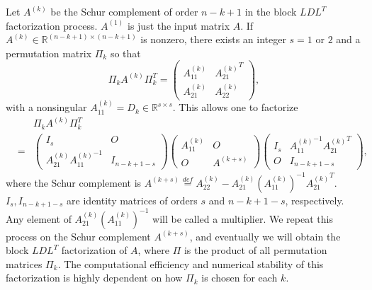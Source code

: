 \documentclass[11pt]{article}
\begin{document}
Let $A^{(k)}$ be the Schur complement of order $n-k+1$ in the block $LDL^T$ factorization process. $A^{(1)}$ is just the input matrix $A$. If $A^{(k)} \in \mathbb{R}^{(n-k+1) \times (n-k+1)}$ is nonzero, there exists an integer $s = 1$ or $2$ and a permutation matrix $\Pi_k$ so that
$$
\Pi_k A^{(k)} \Pi_k^T =  \begin{pmatrix}
A_{11}^{(k)} & {A_{21}^{(k)}}^T \\
A_{21}^{(k)} & A_{22}^{(k)}
\end{pmatrix}, 
$$
with a nonsingular $A_{11}^{(k)} = D_k \in \mathbb{R}^{s \times s}$. This allows one to factorize
\begin{eqnarray*}
&&\Pi_k A^{(k)} \Pi_k^T \\
&=& \left(
\begin{array}{cc}
I_s & O \\
A_{21}^{(k)}{A_{11}^{(k)}}^{-1} & I_{n-k+1-s} 
\end{array}
\right) \left(
\begin{array}{cc}
A_{11}^{(k)} & O \\
O & A^{(k + s)} 
\end{array}
\right) \left(
\begin{array}{cc}
I_s & {A_{11}^{(k)}}^{-1}{A_{21}^{(k)}}^T \\
O & I_{n-k+1-s} 
\end{array}
\right),
\end{eqnarray*}
where the Schur complement is $A^{(k + s)} \stackrel{def}{=} A_{22}^{(k)} - A_{21}^{(k)} \left({A_{11}^{(k)}}\right)^{-1} {A_{21}^{(k)}}^T$. $I_s, I_{n-k+1-s}$ are identity matrices of orders $s$ and $n - k + 1 - s$, respectively. Any element of $A_{21}^{(k)}\left({A_{11}^{(k)}}\right)^{-1}$ will be called a multiplier. We repeat this process on the Schur complement $A^{(k + s)}$, and eventually we will obtain the block $LDL^T$ factorization of $A$, where $\Pi$ is the product of all permutation matrices $\Pi_k$. The computational efficiency and numerical stability of this factorization is highly dependent on how $\Pi_k$ is chosen for each $k$. 
\end{document}

